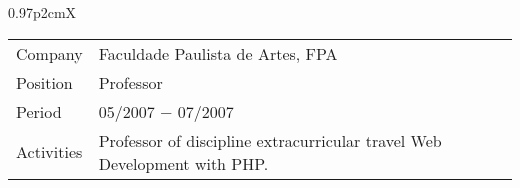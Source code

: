 \documentclass[a4paper, oneside, final]{scrartcl}
\begin{document}
\begin{center}
\begin{tabularx}{0.97\linewidth}{p{2cm}X}
\end{tabularx}
\begin{tabularx}{0.97\linewidth}{p{2cm}X}

Company     & Faculdade Paulista de Artes, FPA \\
Position    & Professor \\
Period      & 05/2007 $-$ 07/2007 \\
Activities  & Professor of discipline extracurricular travel Web Development with PHP. \\ 

\end{tabularx}

%




\end{center}
\end{document}
